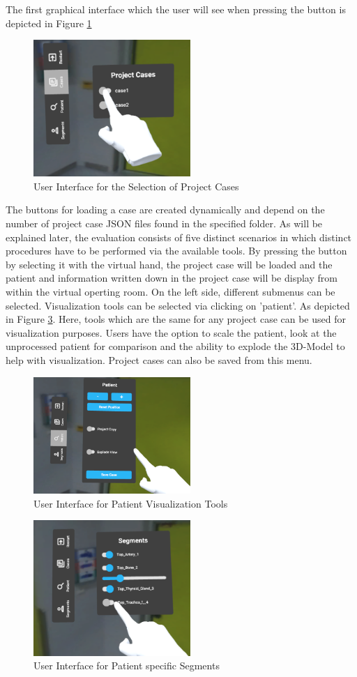 The first graphical interface which the user will see when pressing the button is depicted in Figure \ref{fig::UIProjectCase}
\begin{figure}[ht!]
    \centering
    \includegraphics[width=225px]{images/implementation/user_interface/project_cases.png}
    \caption{\label{fig::UIProjectCase}User Interface for the Selection of Project Cases}
\end{figure}
The buttons for loading a case are created dynamically and depend on the number of project case JSON files found in the specified folder.
As will be explained later, the evaluation consists of five distinct scenarios in which distinct procedures have to be performed via the available tools.
By pressing the button by selecting it with the virtual hand, the project case will be loaded and the patient and information written down in the project case will be display from within the virtual operting room.
On the left side, different submenus can be selected.
Visualization tools can be selected via clicking on 'patient'.
As depicted in Figure \ref{fig::UIPatient}.
Here, tools which are the same for any project case can be used for visualization purposes.
Users have the option to scale the patient, look at the unprocessed patient for comparison and the ability to explode the 3D-Model to help with visualization.
Project cases can also be saved from this menu.

\begin{figure}[ht!]
    \centering
    \includegraphics[width=225px]{images/implementation/user_interface/patient.png}
    \caption{\label{fig::UIPatient}User Interface for Patient Visualization Tools}
\end{figure}

\begin{figure}[ht!]
    \centering
    \includegraphics[width=225px]{images/implementation/user_interface/segments.png}
    \caption{\label{fig::UIPatient}User Interface for Patient specific Segments}
\end{figure}
